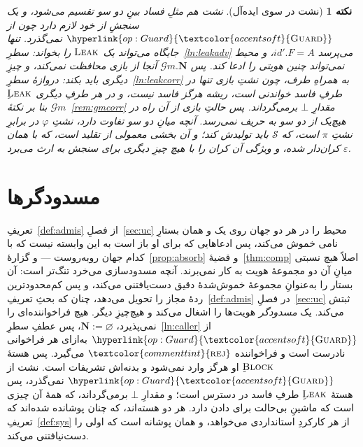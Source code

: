 \documentclass[10pt,oneside,openany]{book}
\renewcommand{\emptyset}{\varnothing}
\newcommand{\admits}{\mathbf{N}}
\newcommand{\Sim}{\mathcal{S}}
\newcommand{\op}[1]{\textnormal{\textsc{#1}}}
\newcommand{\opl}[1]{\hyperlink{op:#1}{\textcolor{accentsoft}{\op{#1}}}}
\newcommand{\id}{id}
\newcommand{\atom}[1]{\textcolor{commenttint}{\op{#1}}}
\newcommand{\rej}{\atom{rej}}
\newcommand{\Gm}{\mathcal{G}m}
\newcommand{\none}{\bot}
\theoremstyle{accentdef}
\newtheorem{remark}[definition]{نکته}
\theoremstyle{accentplain}
\begin{document}
\begin{remark}[نشت در سوی ایده‌آل]\label{rem:propleak}
نشت هم مثلِ فساد بینِ دو سو تقسیم می‌شود، و یک سنجشِ از خود لازم دارد چون از
$\opl{Guard}$ نمی‌گذرد. تنها جایگاه می‌تواند یک $\op{Leak}$ را بخواند:
سطرِ~\ref{ln:leakadv} می‌پرسد $\id'.F = A$، و محیط نمی‌تواند چنین هویتی را
ادعا کند. پس $\Gm.\admits$ آنجا از بازی محافظت نمی‌کند، و چیزِ دیگری باید
بکند: دروازهٔ سطرِ~\ref{ln:leakcorr} به همراهِ طرف، چون نشتِ بازی تنها در
طرفِ فاسد خواندنی است، ریشه هرگز فاسد نیست، و در هر طرفِ دیگری
$\op{Leak}$ِ $\Gm$ بنا بر نکتهٔ~\ref{rem:gmcorr} مقدارِ $\none$
برمی‌گرداند. پس حالتِ بازی از آن راه در هیچ‌یک از دو سو به حریف نمی‌رسد.
آنچه میانِ دو سو تفاوت دارد، نشتِ $\varphi$ در برابرِ نشتِ $\pi$ است، که
$\Sim$ باید تولیدش کند؛ و آن بخشی معمولی از تقلید است، که با همان
$\varepsilon$ کران‌دار شده، و ویژگی آن کران را با هیچ چیزِ دیگری برای سنجش
به ارث می‌برد.
\end{remark}



\chapter{مسدودگرها}\label{sec:blockers}

تعریفِ~\ref{def:admis} از فصلِ~\ref{sec:uc} محیط را در هر دو جهان روی یک و
همان بستارِ نامی خموش می‌کند، پس ادعاهایی که برای او باز است به این وابسته
نیست که با کدام جهان روبه‌روست --- و گزارهٔ~\ref{prop:absorb} و
قضیهٔ~\ref{thm:comp} اصلاً هیچ نسبتی میانِ آن دو مجموعهٔ هویت به کار
نمی‌برند. آنچه مسدودسازی می‌خرد تنگ‌تر است: آن بستار را به‌عنوانِ مجموعهٔ
خموش‌شدهٔ دقیق دست‌یافتنی می‌کند، و پس کم‌محدودترین ردهٔ مجاز را تحویل
می‌دهد، چنان که بحثِ تعریفِ~\ref{def:admis} در فصلِ~\ref{sec:uc} ثبتش
می‌کند. یک \emph{مسدودگر} هویت‌ها را اشغال می‌کند و هیچ‌چیزِ دیگر. هیچ
فراخواننده‌ای را نمی‌پذیرد، $\admits := \emptyset$، پس عطفِ
سطرِ~\ref{ln:caller} از $\opl{Guard}$ به‌ازای هر فراخوانی نادرست است و
فراخواننده $\rej$ می‌گیرد. پس هستهٔ $\op{Block}$ِ او هرگز وارد نمی‌شود و
بدنه‌اش تشریفات است. نشت از $\opl{Guard}$ نمی‌گذرد، پس هستهٔ $\op{Leak}$ِ
طرفِ فاسد در دسترس است؛ و مقدارِ $\none$ برمی‌گرداند، که همهٔ آن چیزی است
که ماشینِ بی‌حالت برای دادن دارد. هر دو هسته‌اند، که چنان پوشانده شده‌اند
که تعریفِ~\ref{def:sys} از هر کارکردِ استانداردی می‌خواهد، و همان پوشانه
است که اولی را دست‌نیافتنی می‌کند.
\end{document}
